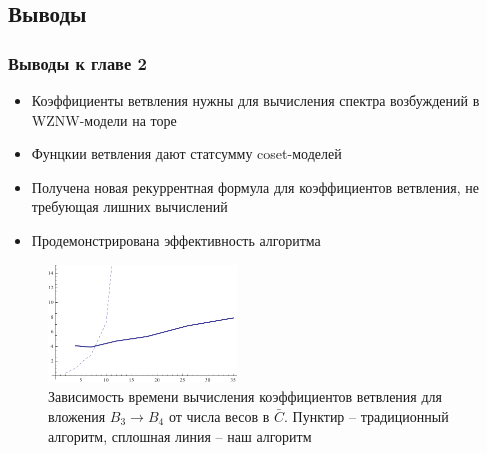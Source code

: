 \documentclass[pdftex]{beamer}
\theoremstyle{definition} \newtheorem{Def}{Определение}
\begin{document}
\subsection{Выводы}
\begin{frame}
  \frametitle{Выводы к главе 2}
  \begin{itemize}
  \item Коэффициенты ветвления нужны для вычисления спектра возбуждений в WZNW-модели на торе
  \item Фунцкии ветвления дают статсумму coset-моделей
  \item Получена новая рекуррентная формула для коэффициентов ветвления, не требующая лишних вычислений
  \item Продемонстрирована эффективность алгоритма
  \end{itemize}
  \begin{figure}[b]
    \centering
      \includegraphics[width=50mm]{figures/branching-timing}
      \vspace{-0.3cm}
      \caption{Зависимость времени вычисления коэффициентов ветвления для вложения $B_{3}\to B_{4}$ от числа весов в $\bar C$. Пунктир -- традиционный алгоритм, сплошная линия -- наш алгоритм}
      \label{fig:branching}
  \end{figure}
\end{frame}
\end{document}
